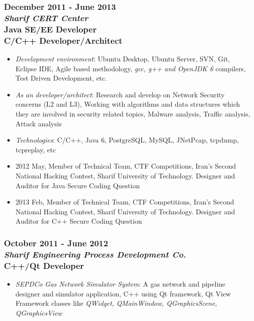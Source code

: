 \documentclass[10pt,a4paper]{article}
\begin{document}
\subsubsection{\textnormal {December 2011 - June 2013} \\ \textnormal {\textit {Sharif CERT Center}} \\ Java SE/EE Developer \\ C/C++ Developer/Architect}
  \setlength{\leftskip}{0.5cm}
  \setlength{\rightskip}{1cm}
	\begin{itemize}
		\setlength{\rightskip}{1cm}
    \setlength\itemsep{0em}
    \item \small \textit {Development environment}: Ubuntu Desktop, Ubuntu Server, SVN, Git, Eclipse IDE, Agile based methodology, \textit {gcc, g++ and OpenJDK 6} compilers, Test Driven Development, etc.
    \item \small \textit {As an developer/architect}: Research and develop on Network Security concerns (L2 and L3), Working with algorithms and data structures which they are involved in security related topics, Malware analysis, Traffic analysis, Attack analysis
    \item \small \textit {Technologies}: C/C++, Java 6, PostgreSQL, MySQL, JNetPcap, tcpdump, tcpreplay, etc
		\item \small 2012 May, Member of Technical Team, CTF Competitions, Iran's Second National Hacking Contest, Sharif University of Technology. Designer and Auditor for Java Secure Coding Question
		\item \small 2013 Feb, Member of Technical Team, CTF Competitions, Iran's Second National Hacking Contest, Sharif University of Technology. Designer and Auditor for C++ Secure Coding Question
	\end{itemize}
  \setlength{\leftskip}{0pt}
  \setlength{\rightskip}{0cm}
	  
\subsubsection{\textnormal {October 2011 - June 2012} \\ \textnormal {\textit {Sharif Engineering Process Development Co.}} \\ C++/Qt Developer}
  \setlength{\leftskip}{0.5cm}
  \setlength{\rightskip}{1cm}
  \begin{itemize}
    \setlength{\rightskip}{1cm}
    \setlength\itemsep{0em}
		\item \small \textit{SEPDCo Gas Network Simulator System}: A gas network and pipeline designer and simulator application, C++ using Qt framework, Qt View Framework classes like \textit {QWidget, QMainWindow, QGraphicsScene, QGraphicsView}
  \end{itemize}
  \setlength{\leftskip}{0pt}
  \setlength{\rightskip}{0cm}
  
\end{document}
